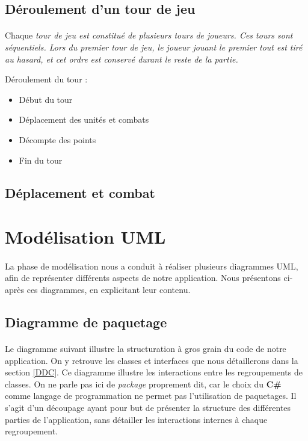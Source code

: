 \documentclass[a4paper]{article}
\begin{document}
\subsection{Déroulement d'un tour de jeu}
\paragraph{}
Chaque \em{tour de jeu} est constitué de plusieurs \em{tours de joueurs}. Ces tours sont séquentiels. Lors du premier tour de jeu, le joueur jouant le premier tout est tiré au hasard, et cet ordre est conservé durant le reste de la partie.

Déroulement du tour :
\begin{itemize}
    \item Début du tour
    \item Déplacement des unités et combats
    \item Décompte des points
    \item Fin du tour
\end{itemize}

\subsection{Déplacement et combat}


\section{Modélisation UML}
\paragraph{}
La phase de modélisation nous a conduit à réaliser plusieurs diagrammes UML, afin de représenter différents aspects de notre application. Nous présentons ci-après ces diagrammes, en explicitant leur contenu.

\subsection{Diagramme de paquetage}
\paragraph{}
Le diagramme suivant illustre la structuration à gros grain du code de notre application. On y retrouve les classes et interfaces que nous détaillerons dans la section \ref{DDC}. Ce diagramme illustre les interactions entre les regroupements de classes. On ne parle pas ici de \textit{package} proprement dit, car le choix du \textbf{C\#} comme langage de programmation ne permet pas l'utilisation de paquetages. Il s'agit d'un découpage ayant pour but de présenter la structure des différentes parties de l'application, sans détailler les interactions internes à chaque regroupement.
\end{document}
